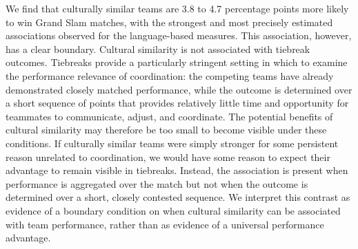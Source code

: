 \documentclass[10pt]{article}
\begin{document}
We find that culturally similar teams are 3.8 to 4.7 percentage points more likely to win Grand Slam matches, with the strongest and most precisely estimated associations observed for the language-based measures. This association, however, has a clear boundary. Cultural similarity is not associated with tiebreak outcomes. Tiebreaks provide a particularly stringent setting in which to examine the performance relevance of coordination: the competing teams have already demonstrated closely matched performance, while the outcome is determined over a short sequence of points that provides relatively little time and opportunity for teammates to communicate, adjust, and coordinate. The potential benefits of cultural similarity may therefore be too small to become visible under these conditions. If culturally similar teams were simply stronger for some persistent reason unrelated to coordination, we would have some reason to expect their advantage to remain visible in tiebreaks. Instead, the association is present when performance is aggregated over the match but not when the outcome is determined over a short, closely contested sequence. We interpret this contrast as evidence of a boundary condition on when cultural similarity can be associated with team performance, rather than as evidence of a universal performance advantage.



\end{document}
